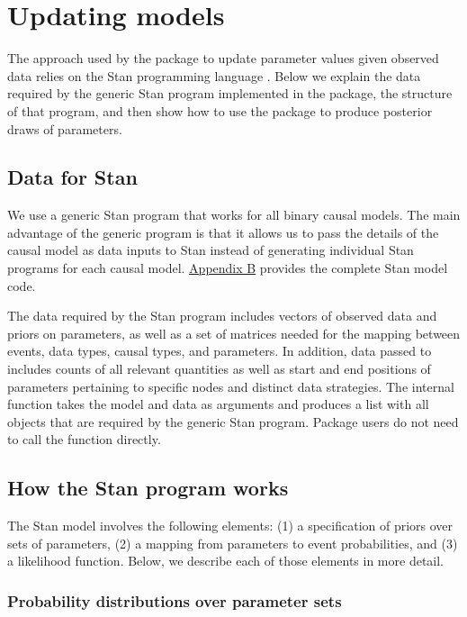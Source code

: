 \documentclass[
  11pt,
  article]{jss}
\renewcommand{\texttt}[1]{\code{#1}}
\begin{document}
\section{Updating models}\label{sec-update}

The approach used by the  package to update parameter
values given observed data relies on the Stan programming language
\citep{carpenter_stan_2017}. Below we explain the data required by the
generic Stan program implemented in the package, the structure of that
program, and then show how to use the package to produce posterior draws
of parameters.

\subsection{Data for Stan}\label{data-for-stan}

We use a generic Stan program that works for all binary causal models.
The main advantage of the generic program is that it allows us to pass
the details of the causal model as data inputs to Stan instead of
generating individual Stan programs for each causal model.
\hyperref[sec-stancode]{Appendix B} provides the complete Stan model
code.

The data required by the Stan program includes vectors of observed data
and priors on parameters, as well as a set of matrices needed for the
mapping between events, data types, causal types, and parameters. In
addition, data passed to \texttt{stan} includes counts of all relevant
quantities as well as start and end positions of parameters pertaining
to specific nodes and distinct data strategies. The internal function
\texttt{prep\_stan\_data()} takes the model and data as arguments and
produces a list with all objects that are required by the generic Stan
program. Package users do not need to call the
\texttt{prep\_stan\_data()} function directly.

\subsection{How the Stan program
works}\label{how-the-stan-program-works}

The Stan model involves the following elements: (1) a specification of
priors over sets of parameters, (2) a mapping from parameters to event
probabilities, and (3) a likelihood function. Below, we describe each of
those elements in more detail.

\subsubsection{Probability distributions over parameter
sets}\label{probability-distributions-over-parameter-sets}
\end{document}
